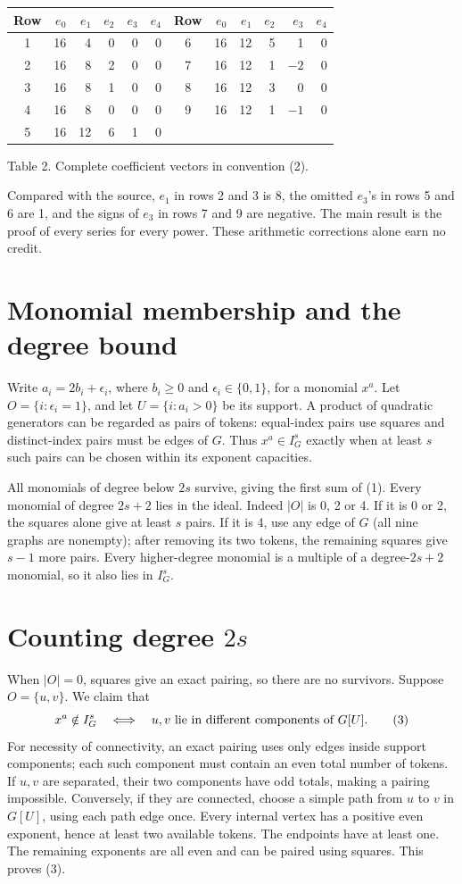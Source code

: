 \documentclass[11pt]{article}
\begin{document}
\begin{center}
\begin{tabular}{c rrrrr c rrrrr}
\toprule
Row&\(e_0\)&\(e_1\)&\(e_2\)&\(e_3\)&\(e_4\)&
Row&\(e_0\)&\(e_1\)&\(e_2\)&\(e_3\)&\(e_4\)\\\midrule
1&16&4&0&0&0&6&16&12&5&1&0\\
2&16&8&2&0&0&7&16&12&1&\(-2\)&0\\
3&16&8&1&0&0&8&16&12&3&0&0\\
4&16&8&0&0&0&9&16&12&1&\(-1\)&0\\
5&16&12&6&1&0&&&&&&\\\bottomrule
\end{tabular}
\par\smallskip Table 2. Complete coefficient vectors in convention (2).
\end{center}
Compared with the source, \(e_1\) in rows 2 and 3 is 8, the omitted
\(e_3\)'s in rows 5 and 6 are 1, and the signs of \(e_3\) in rows
7 and 9 are negative. The main result is the proof of every series
for every power. These arithmetic corrections alone earn no credit.

\section*{Monomial membership and the degree bound}
Write \(a_i=2b_i+\epsilon_i\), where \(b_i\geq0\) and
\(\epsilon_i\in\{0,1\}\), for a monomial \(x^a\).
Let \(O=\{i:\epsilon_i=1\}\), and let
\(U=\{i:a_i>0\}\) be its support. A product of quadratic
generators can be regarded as pairs of tokens: equal-index pairs
use squares and distinct-index pairs must be edges of \(G\).
Thus \(x^a\in I_G^s\) exactly when at least \(s\) such pairs
can be chosen within its exponent capacities.

All monomials of degree below \(2s\) survive, giving the first
sum of (1). Every monomial of degree \(2s+2\) lies in the ideal.
Indeed \(|O|\) is 0, 2 or 4. If it is 0 or 2, the squares alone
give at least \(s\) pairs. If it is 4, use any edge of \(G\)
(all nine graphs are nonempty); after removing its two tokens,
the remaining squares give \(s-1\) more pairs. Every higher-degree
monomial is a multiple of a degree-\(2s+2\) monomial, so it also
lies in \(I_G^s\).

\section*{Counting degree \(2s\)}
When \(|O|=0\), squares give an exact pairing, so there are no
survivors. Suppose \(O=\{u,v\}\). We claim that
\[
 x^a\notin I_G^s\quad\Longleftrightarrow\quad
 u,v\hbox{ lie in different components of }G[U].             \tag{3}
\]
For necessity of connectivity, an exact pairing uses only edges
inside support components; each such component must contain an
even total number of tokens. If \(u,v\) are separated, their two
components have odd totals, making a pairing impossible.
Conversely, if they are connected, choose a simple path from \(u\)
to \(v\) in \(G[U]\), using each path edge once. Every internal
vertex has a positive even exponent, hence at least two available
tokens. The endpoints have at least one. The remaining exponents
are all even and can be paired using squares. This proves (3).
\end{document}
